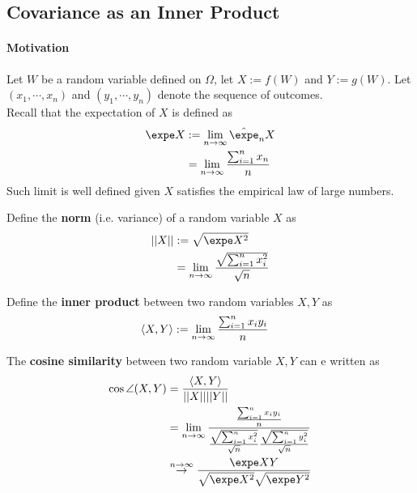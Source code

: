\documentclass{article}
\begin{document}
   	\subsection{Covariance as an Inner Product}
   	\paragraph{Motivation} Let $W$ be a random variable defined on $\Omega$, let $X := f(W)$ and $Y := g(W)$. Let $(x_1, \cdots, x_n)$ and $(y_1, \cdots, y_n)$ denote the sequence of outcomes. \\
   	Recall that the expectation of $X$ is defined as
   	\begin{align}
   		\expe X &:= \lim_{n \to \infty} \hat{\expe}_n X \\
   		&= \lim_{n \to \infty} \frac{\sum_{i=1}^n x_n}{n}
   	\end{align}
   	Such limit is well defined given $X$ satisfies the empirical law of large numbers.
   	
   	\begin{definition}
   		Define the \textbf{norm} (i.e. variance) of a random variable $X$ as 
   		\begin{align}
   			\norm{X} &:= \sqrt{\expe X^2} \\
   			&= \lim_{n \to \infty} \frac{\sqrt{\sum_{i=1}^n x_i^2}}{\sqrt{n}}
   		\end{align}
   	\end{definition}
   	\begin{definition}
   		Define the \textbf{inner product} between two random variables $X, Y$ as 
   		\begin{align}
   			\langle {X}, {Y} \rangle &:= \lim_{n \to \infty} \frac{\sum_{i=1}^n x_i y_i}{n}
   		\end{align}
   	\end{definition}
   	
   	\begin{definition}
   		The \textbf{cosine similarity} between two random variable $X, Y$ can e written as
   		\begin{align}
   			\cos \angle (X, Y) &= \frac{\inner{X}{Y}}{\norm{X} \norm{Y}} \\
   			&= \lim_{n \to \infty} \frac{\frac{\sum_{i=1}^n x_i y_i}{n}}{\frac{\sqrt{\sum_{i=1}^n x_i^2}}{\sqrt{n}} \frac{\sqrt{\sum_{i=1}^n y_i^2}}{\sqrt{n}}} \\
   			&\overset{n \to \infty}{\to} \frac{\expe XY}{\sqrt{\expe X^2} \sqrt{\expe Y^2}}
   		\end{align}
   	\end{definition}
   	
\end{document}

